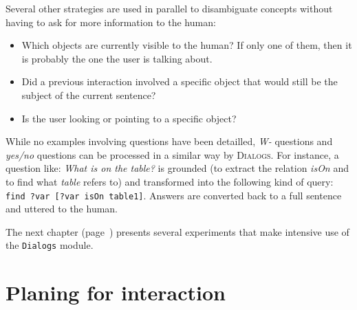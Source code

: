 Several other strategies are used in parallel to disambiguate concepts without
having to ask for more information to the human: 

\begin{itemize}
	\item Which objects are currently visible to the human? If only one of
	them, then it is probably the one the user is talking about. 
	\item Did a previous interaction involved a specific object that would
	still be the subject of the current sentence?
	\item Is the user looking or pointing to a specific object?
\end{itemize}
 
While no examples involving questions have been detailled, \emph{W-} questions
and \emph{yes/no} questions can be processed in a similar way by
\textsc{Dialogs}. For instance, a question like: \emph{What is on the table?}
is grounded (to extract the relation \emph{isOn} and to find what \emph{table}
refers to) and transformed into the following kind of query: {\tt find ?var [?var isOn
table1]}.  Answers are converted back to a full sentence and uttered to the
human.


The next chapter (page~\pageref{chapter|evaluation}) presents several
experiments that make intensive use of the {\tt Dialogs} module.

\section{Planing for interaction}
\label{sect|planing-for-interaction}


